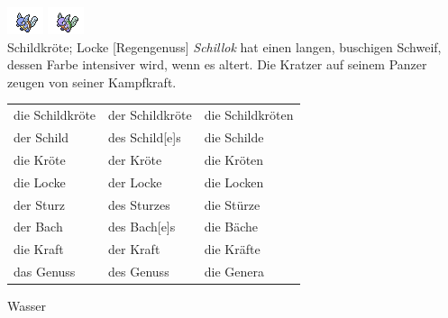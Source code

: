 \documentclass[a7paper,10pt,grid=both
,toc
]{kartei}
\begin{document}
\begin{karte}[Sturzbach]{
\includegraphics{../regular/wartortle}
\includegraphics{../shiny/wartortle} \\
Schildkröte; Locke
}[Regengenuss]
\emph{Schillok} hat einen langen, buschigen Schweif, dessen Farbe intensiver 
wird, wenn es altert. Die Kratzer auf seinem Panzer zeugen von seiner 
Kampfkraft.

\vspace{5pt}
\begin{tabular}{lll}
die Schildkröte	&	der Schildkröte	&	die Schildkröten \\
der Schild	&	des Schild[e]s	&	die Schilde \\
die Kröte	&	der Kröte	&	die Kröten \\
die Locke	&	der Locke	&	die Locken \\
der Sturz	&	des Sturzes	&	die Stürze \\
der Bach	&	des Bach[e]s	&	die Bäche \\
die Kraft	&	der Kraft	&	die Kräfte \\
das Genuss	&	des Genuss	&	die Genera \\
\end{tabular}
\vspace{5pt}

Wasser
\end{karte}









\end{document}
